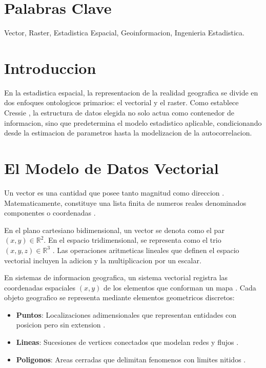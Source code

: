 \documentclass[11pt,a4paper]{article}
\begin{document}
\section*{Palabras Clave}
Vector, Raster, Estadistica Espacial, Geoinformacion, Ingenieria Estadistica.

\newpage
\tableofcontents
\newpage

\section{Introduccion}
En la estadistica espacial, la representacion de la realidad geografica se divide en dos enfoques ontologicos primarios: el vectorial y el raster. Como establece Cressie \cite{cressie1993statistics}, la estructura de datos elegida no solo actua como contenedor de informacion, sino que predetermina el modelo estadistico aplicable, condicionando desde la estimacion de parametros hasta la modelizacion de la autocorrelacion.

\section{El Modelo de Datos Vectorial}

Un vector es una cantidad que posee tanto magnitud como direccion \cite{simons1970vector}. Matematicamente, constituye una lista finita de numeros reales denominados componentes o coordenadas \cite{shapira2019vectors}.

En el plano cartesiano bidimensional, un vector se denota como el par $(x, y) \in \mathbb{R}^2$. En el espacio tridimensional, se representa como el trio $(x, y, z) \in \mathbb{R}^3$ \cite{shapira2019vectors}. Las operaciones aritmeticas lineales que definen el espacio vectorial incluyen la adicion y la multiplicacion por un escalar.

En sistemas de informacion geografica, un sistema vectorial registra las coordenadas espaciales $(x, y)$ de los elementos que conforman un mapa \cite{osullivan2010geographic}. Cada objeto geografico se representa mediante elementos geometricos discretos:

\begin{itemize}
    \item \textbf{Puntos}: Localizaciones adimensionales que representan entidades con posicion pero sin extension \cite{yang2014principles}.
    \item \textbf{Lineas}: Sucesiones de vertices conectados que modelan redes y flujos \cite{bivand2013applied}.
    \item \textbf{Poligonos}: Areas cerradas que delimitan fenomenos con limites nitidos \cite{yang2014principles}.
\end{itemize}
\end{document}
